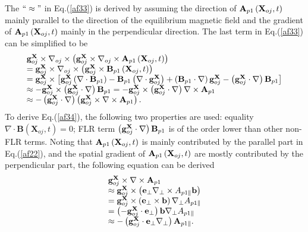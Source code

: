 \documentclass[12pt]{iopart}
\begin{document}
The $``\approx"$ in Eq.(\ref{af33}) is derived by assuming the direction of ${{{\bf{A}}_{p1}}\left( {{{\bf{X}}_{oj}},t} \right)}$ mainly parallel to the direction of the equilibrium magnetic field and the gradient of ${{{\bf{A}}_{p1}}\left( {{{\bf{X}}_{oj}},t} \right)}$ mainly in the perpendicular direction. The last term in Eq.(\ref{af33}) can be simplified to be
\begin{equation}\label{af34}
\begin{array}{l}
{\bf{g}}_{oj}^{\bf{X}} \times {\nabla _{oj}} \times \left( {{\bf{g}}_{oj}^{\bf{X}} \times {\nabla _{oj}} \times {{\bf{A}}_{p1}}\left( {{{\bf{X}}_{oj}},t} \right)} \right)\\
 = {\bf{g}}_{oj}^{\bf{X}} \times {\nabla _{oj}} \times \left( {{\bf{g}}_{oj}^{\bf{X}} \times {{\bf{B}}_{p1}}\left( {{{\bf{X}}_{oj}},t} \right)} \right)\\
 = {\bf{g}}_{oj}^{\bf{X}} \times \left[ {{\bf{g}}_{oj}^{\bf{X}}\left( {\nabla \cdot{{\bf{B}}_{p1}}} \right) - {{\bf{B}}_{p1}}\left( {\nabla \cdot{\bf{g}}_{oj}^{\bf{X}}} \right) + \left( {{{\bf{B}}_{p1}}\cdot\nabla } \right){\bf{g}}_{oj}^{\bf{X}} - \left( {{\bf{g}}_{oj}^{\bf{X}}\cdot\nabla } \right){{\bf{B}}_{p1}}} \right]\\
 \approx  - {\bf{g}}_{oj}^{\bf{X}} \times \left( {{\bf{g}}_{oj}^{\bf{X}}\cdot\nabla } \right){{\bf{B}}_{p1}} =  - {\bf{g}}_{oj}^{\bf{X}} \times \left( {{\bf{g}}_{oj}^{\bf{X}}\cdot\nabla } \right)\nabla  \times {{\bf{A}}_{p1}}\\
 \approx  - \left( {{\bf{g}}_{oj}^{\bf{X}}\cdot\nabla } \right)\left( {{\bf{g}}_{oj}^{\bf{X}} \times \nabla  \times {{\bf{A}}_{p1}}} \right).
\end{array}
\end{equation}
To derive Eq.(\ref{af34}), the following two properties are used: equality $\nabla\cdot \mathbf{B}(\mathbf{X}_{oj},t)=0$; FLR term ${\left( {{\bf{g}}_{oj}^{\bf{X}}\cdot\nabla } \right){{\bf{B}}_{p1}}}$ is of the order lower than other non-FLR terms. Noting that ${{{\bf{A}}_{p1}}\left( {{{\bf{X}}_{oj}},t} \right)}$ is mainly contributed by the parallel part in Eq.(\ref{af22}), and the spatial gradient of ${{{\bf{A}}_{p1}}\left( {{{\bf{X}}_{oj}},t} \right)}$ are mostly contributed by the perpendicular part, the following equation can be derived
\begin{equation}\label{af35}
\begin{array}{l}
{\bf{g}}_{oj}^{\bf{X}} \times \nabla  \times {{\bf{A}}_{p1}}\\
 \approx {\bf{g}}_{oj}^{\bf{X}} \times \left( {{{\bf{e}}_ \bot }{\nabla _ \bot } \times {A_{p1\parallel }}{\bf{b}}} \right)\\
 = {\bf{g}}_{oj}^{\bf{X}} \times \left( {{{\bf{e}}_ \bot } \times {\bf{b}}} \right){\nabla _ \bot }{A_{p1\parallel }}\\
 = \left( { - {\bf{g}}_{oj}^{\bf{X}}\cdot{{\bf{e}}_ \bot }} \right){\bf{b}}{\nabla _ \bot }{A_{p1\parallel }}\\
 \approx  - \left( {{\bf{g}}_{oj}^{\bf{X}}\cdot{{\bf{e}}_ \bot }{\nabla _ \bot }} \right){{\bf{A}}_{p1\parallel}}.
\end{array}
\end{equation}
\end{document}
